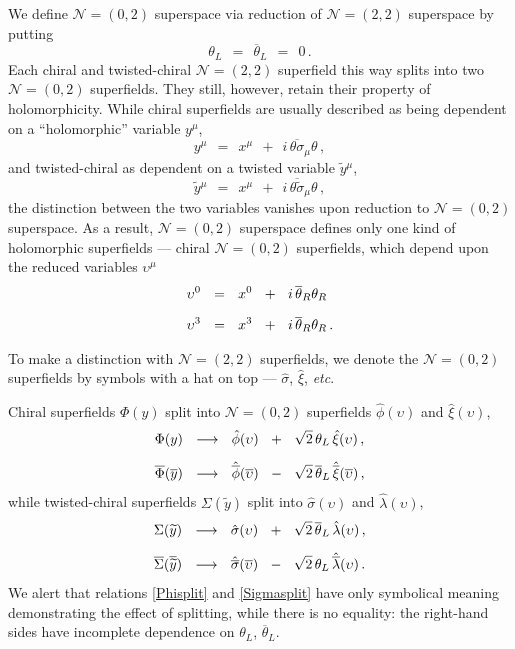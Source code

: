 \documentclass[epsfig,12pt]{article}
\def\beq{\begin{equation}}
\def\eeq{\end{equation}}
\newcommand{\ntwot}{${\mathcal N}= \left(2,2\right) $ }
\newcommand{\ntwoo}{${\mathcal N}= \left(0,2\right) $ }
\newcommand{\wt}{\widetilde}
\newcommand{\ov}{\overline}
\newcommand{\hphi}{\hat\phi{}}
\newcommand{\hbphi}{\hat{\ov\phi}{}}
\newcommand{\hxi}{\hat\xi{}}
\newcommand{\hbxi}{\hat{\ov\xi}{}}
\newcommand{\hsigma}{\hat\sigma{}}
\newcommand{\hbsigma}{\hat{\ov\sigma}{}}
\newcommand{\hlambda}{\hat\lambda{}}
\newcommand{\hblambda}{\hat{\ov\lambda}{}}
\begin{document}
	We define \ntwoo superspace via reduction of \ntwot superspace by putting
\beq
	\theta_L    ~~=~~    \ov\theta{}_L    ~~=~~    0\,.
\eeq
	Each chiral and twisted-chiral \ntwot superfield this way splits into two \ntwoo superfields.
	They still, however, retain their property of holomorphicity.
	While chiral superfields are usually described as being dependent on
	a ``holomorphic'' variable $ y^\mu $,
\beq
	y^\mu    ~~=~~    x^\mu    ~~+~~    i\,\ov{\theta\sigma}{}_\mu\theta\,,
\eeq
	and twisted-chiral as dependent on a twisted variable $ \wt y{}^\mu $,
\beq
	\wt y{}^\mu    ~~=~~    x^\mu    ~~+~~    i\,\ov{\theta\wt\sigma}{}_\mu\theta\,,
\eeq
	the distinction between the two variables vanishes upon reduction to \ntwoo superspace.
	As a result, \ntwoo superspace defines only one kind of holomorphic superfields --- 
	chiral \ntwoo superfields, which depend upon the reduced variables $ \upsilon^\mu $
\begin{align}
%
\notag
	\upsilon^0 &    ~~=~~    x^0  ~~+~~  i\,\ov\theta{}_R\theta_R
	\\[2mm]
%
	\upsilon^3 &    ~~=~~    x^3  ~~+~~  i\,\ov\theta{}_R\theta_R\,.
\end{align}

	To make a distinction with \ntwot superfields, we denote the \ntwoo superfields
	by symbols with a hat on top --- $ \hsigma $, $ \hxi $, {\it etc}.

	Chiral superfields $ \Phi(y) $ split into \ntwoo superfields 
	$ \hphi(\upsilon) $ and $ \hxi(\upsilon) $,
\begin{align}
%
\notag
	\Phi(y) &    ~~\longrightarrow~~    \hphi(\upsilon)  ~~+~~  \sqrt{2}\,\theta_L\,\hxi(\upsilon)\,,
	\\[2mm]
%
\label{Phisplit}
	\ov\Phi(\ov y) &    ~~\longrightarrow~~    \hbphi(\ov\upsilon)  ~~-~~  \sqrt{2}\,\ov\theta{}_L\,\hbxi(\ov\upsilon)\,,
\end{align}
	while twisted-chiral superfields $ \Sigma(\wt y) $ split into 
	$ \hsigma(\upsilon) $ and $ \hlambda(\upsilon) $,
\begin{align}
%
\notag
	\Sigma(\wt y) &    ~~\longrightarrow~~    \hsigma(\upsilon)  ~~+~~  \sqrt{2}\,\ov\theta{}_L\,\hlambda(\upsilon)\,,
	\\[2mm]
%
\label{Sigmasplit}
	\ov\Sigma(\ov{\wt y}) &    ~~\longrightarrow~~    \hbsigma(\ov\upsilon)  ~~-~~  \sqrt{2}\,\theta_L\,\hblambda(\upsilon)\,.
\end{align}
	We alert that relations \eqref{Phisplit} and \eqref{Sigmasplit} have only symbolical meaning demonstrating
	the effect of splitting, while there is no equality:
	the right-hand sides have incomplete dependence on $ \theta_L $, $ \ov\theta{}_L $.
\end{document}
